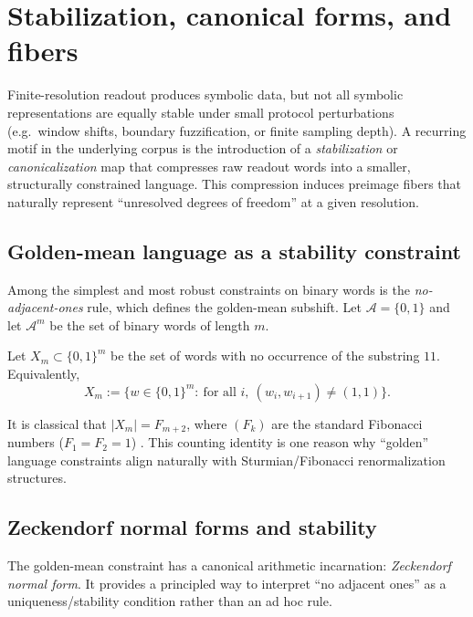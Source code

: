 \section{Stabilization, canonical forms, and fibers}\label{sec:stabilization}

Finite-resolution readout produces symbolic data, but not all symbolic representations are equally stable under small protocol perturbations (e.g.\ window shifts, boundary fuzzification, or finite sampling depth). A recurring motif in the underlying corpus is the introduction of a \emph{stabilization} or \emph{canonicalization} map that compresses raw readout words into a smaller, structurally constrained language. This compression induces preimage fibers that naturally represent ``unresolved degrees of freedom'' at a given resolution.

\subsection{Golden-mean language as a stability constraint}\label{sec:stabilization:golden-mean}

Among the simplest and most robust constraints on binary words is the \emph{no-adjacent-ones} rule, which defines the golden-mean subshift. Let $\mathcal{A}=\{0,1\}$ and let $\mathcal{A}^m$ be the set of binary words of length $m$.

\begin{definition}\label{def:Xm}
Let $X_m\subset \{0,1\}^m$ be the set of words with no occurrence of the substring $11$. Equivalently,
\[
X_m := \{w\in\{0,1\}^m:\ \text{for all }i,\ (w_i,w_{i+1})\neq (1,1)\}.
\]
\end{definition}

It is classical that $|X_m| = F_{m+2}$, where $(F_k)$ are the standard Fibonacci numbers ($F_1=F_2=1$) \cite{Lothaire2002}. This counting identity is one reason why ``golden'' language constraints align naturally with Sturmian/Fibonacci renormalization structures.

\subsection{Zeckendorf normal forms and stability}\label{sec:stabilization:zeckendorf}

The golden-mean constraint has a canonical arithmetic incarnation: \emph{Zeckendorf normal form}. It provides a principled way to interpret ``no adjacent ones'' as a uniqueness/stability condition rather than an ad hoc rule.

